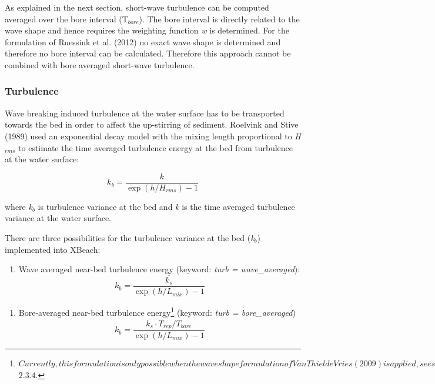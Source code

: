 \documentclass{article}
\begin{document}
\noindent As explained in the next section, short-wave turbulence can be computed averaged over the bore interval (T${}_{bore}$). The bore interval is directly related to the wave shape and hence requires the weighting function \textit{w} is determined. For the formulation of Ruessink et al. (2012) no exact wave shape is determined and therefore no bore interval can be calculated. Therefore this approach cannot be combined with bore averaged short-wave turbulence.


\subsubsection{ Turbulence}

\noindent Wave breaking induced turbulence at the water surface has to be transported towards the bed in order to affect the up-stirring of sediment. Roelvink and Stive (1989) used an exponential decay model with the mixing length proportional to \textit{H${}_{rms}$} to estimate the time averaged turbulence energy at the bed from turbulence at the water surface:

\noindent 
\begin{equation} \label{2.32)} 
k_{b} =\frac{k}{\exp (h/H_{rms} )-1}  
\end{equation} 


\noindent where \textit{k${}_{b}$} is turbulence variance at the bed and \textit{k} is the time averaged turbulence variance at the water surface. 

\noindent 

\noindent There are three possibilities for the turbulence variance at the bed (\textit{k${}_{b}$}) implemented into XBeach:

\noindent 

\begin{enumerate}
\item  Wave averaged near-bed turbulence energy (keyword: \textit{turb = wave\_averaged}):
\begin{equation} \label{2.33)} 
k_{b} =\frac{\overline{k_{s} }}{\exp (h/L_{mix} )-1}  
\end{equation} 
\end{enumerate}


\begin{enumerate}
\item  Bore-averaged near-bed turbulence energy\footnote{ $ Currently, this formulation is only possible when the wave shape formulation of Van Thiel de Vries (2009) is applied, see section $  $2.3.4.$ } (keyword: \textit{turb = bore\_averaged})
\begin{equation} \label{2.34)} 
k_{b} =\frac{\overline{k_{s} }\cdot T_{rep} /T_{bore} }{\exp (h/L_{mix} )-1}  
\end{equation} 
\end{enumerate}
\end{document}
